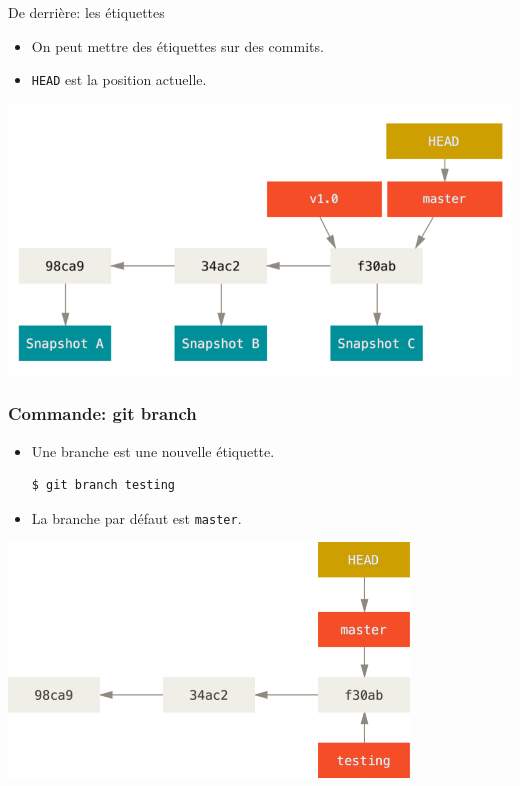 \documentclass{beamer}
\begin{document}
\begin{frame}{De derrière: les étiquettes}
    \begin{itemize}
        \item On peut mettre des étiquettes sur des commits.
        \item \texttt{HEAD} est la position actuelle.
    \end{itemize}
    \includegraphics[width=\textwidth]{img/branch-and-history.png}
\end{frame}

\begin{frame}[fragile]
    \frametitle{Commande: git branch}
    \begin{itemize}
        \item Une branche est une nouvelle étiquette.
\begin{lstlisting}
$ git branch testing
\end{lstlisting}
        \item La branche par défaut est \texttt{master}.
    \end{itemize}
    \begin{center}
        \includegraphics[width=0.8\textwidth]{img/head-to-master.png}
    \end{center}
\end{frame}
\end{document}
